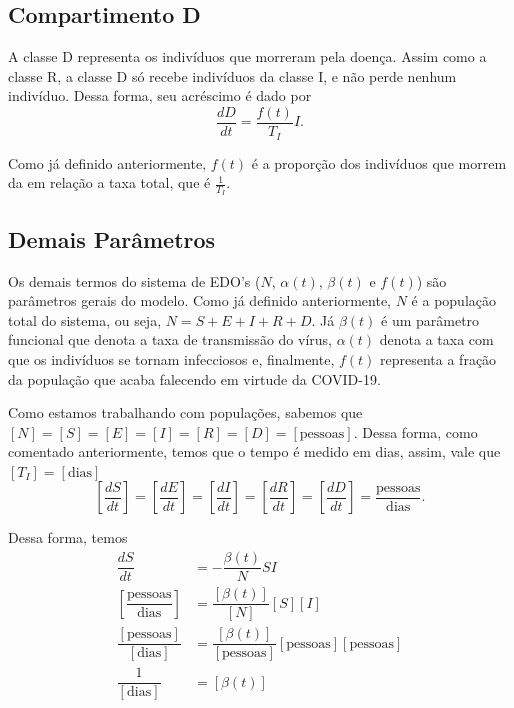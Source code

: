 \documentclass{article}
\begin{document}
\subsection{Compartimento D}

A classe D representa os indivíduos que morreram pela doença. Assim como a classe R, a classe D só recebe indivíduos da classe I, e não perde nenhum indivíduo. Dessa forma, seu acréscimo é dado por
\[\dfrac{dD}{dt} = \dfrac{f(t)}{T_I}I.\]

Como já definido anteriormente, $f(t)$ é a proporção dos indivíduos que morrem da em relação a taxa total, que é $\frac{1}{T_I}$. 

\subsection{Demais Parâmetros}

Os demais termos do sistema de EDO's ($N$, $\alpha(t)$, $\beta(t)$ e $f(t)$) são parâmetros gerais do modelo. Como já definido anteriormente, $N$ é a população total do sistema, ou seja, $N = S + E + I + R + D$. Já $\beta(t)$ é um parâmetro funcional que denota a taxa de transmissão do vírus, $\alpha(t)$ denota a taxa com que os indivíduos se tornam infecciosos e, finalmente, $f(t)$ representa a fração da população que acaba falecendo em virtude da COVID-19.

% 
Como estamos trabalhando com populações, sabemos que $[N] = [S] = [E] = [I] = [R] = [D] = [\text{pessoas}]$. Dessa forma, como comentado %
anteriormente, temos que o tempo é medido em dias, assim, vale que $[T_I] = [\text{dias}]$
\[\left[\dfrac{dS}{dt}\right] = \left[\dfrac{dE}{dt}\right] = \left[\dfrac{dI}{dt}\right] = \left[\dfrac{dR}{dt}\right] = \left[\dfrac{dD}{dt}\right] = \dfrac{\text{pessoas}}{\text{dias}}.\]

Dessa forma, temos
\begin{equation*}
    \begin{split}
        \dfrac{dS}{dt} & = -\dfrac{\beta(t)}{N}SI \\
        \left[\dfrac{\text{pessoas}}{\text{dias}}\right] & = \dfrac{[\beta(t)]}{[N]}[S][I] \\
        \dfrac{[\text{pessoas}]}{[\text{dias}]} & = \dfrac{[\beta(t)]}{[\text{pessoas}]}[\text{pessoas}][\text{pessoas}] \\
        \dfrac{1}{[\text{dias}]} & = [\beta(t)]
    \end{split}
\end{equation*}
\end{document}
